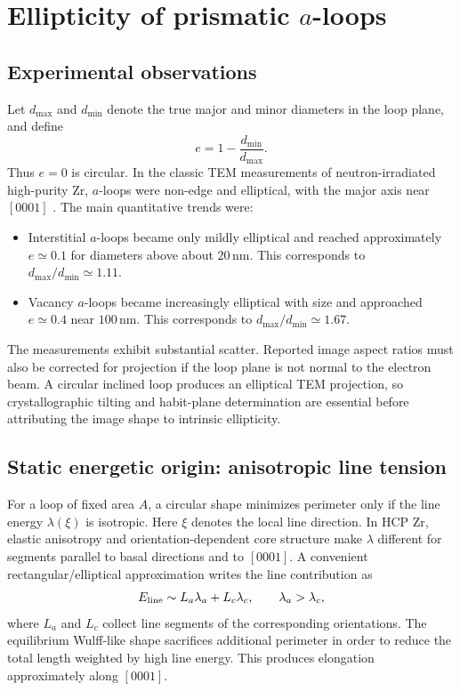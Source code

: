 \documentclass[11pt]{article}
\newcommand{\SI}[2]{\ensuremath{#1\,#2}}
\newcommand{\meter}{\mathrm{m}}
\newcommand{\nano}{\mathrm{n}}
\begin{document}
\section{Ellipticity of prismatic $a$-loops}

\subsection{Experimental observations}

Let $d_{\max}$ and $d_{\min}$ denote the true major and minor diameters in the loop plane, and define
\begin{equation}
 e=1-\frac{d_{\min}}{d_{\max}}.
 \label{eq:ellipticity}
\end{equation}
Thus $e=0$ is circular. In the classic TEM measurements of neutron-irradiated high-purity Zr, $a$-loops were non-edge and elliptical, with the major axis near $[0001]$ \citep{Jostsons1977Nature}. The main quantitative trends were:
\begin{itemize}
 \item Interstitial $a$-loops became only mildly elliptical and reached approximately $e\simeq0.1$ for diameters above about \SI{20}{\nano\meter}. This corresponds to $d_{\max}/d_{\min}\simeq1.11$.
 \item Vacancy $a$-loops became increasingly elliptical with size and approached $e\simeq0.4$ near \SI{100}{\nano\meter}. This corresponds to $d_{\max}/d_{\min}\simeq1.67$.
\end{itemize}
The measurements exhibit substantial scatter. Reported image aspect ratios must also be corrected for projection if the loop plane is not normal to the electron beam. A circular inclined loop produces an elliptical TEM projection, so crystallographic tilting and habit-plane determination are essential before attributing the image shape to intrinsic ellipticity.

\subsection{Static energetic origin: anisotropic line tension}

For a loop of fixed area $A$, a circular shape minimizes perimeter only if the line energy $\lambda(\xi)$ is isotropic. Here $\xi$ denotes the local line direction. In HCP Zr, elastic anisotropy and orientation-dependent core structure make $\lambda$ different for segments parallel to basal directions and to $[0001]$. A convenient rectangular/elliptical approximation writes the line contribution as
\begin{equation}
 E_{\rm line}\sim L_a\lambda_a+L_c\lambda_c,
 \qquad \lambda_a>\lambda_c,
 \label{eq:line-energy}
\end{equation}
where $L_a$ and $L_c$ collect line segments of the corresponding orientations. The equilibrium Wulff-like shape sacrifices additional perimeter in order to reduce the total length weighted by high line energy. This produces elongation approximately along $[0001]$.
\end{document}
